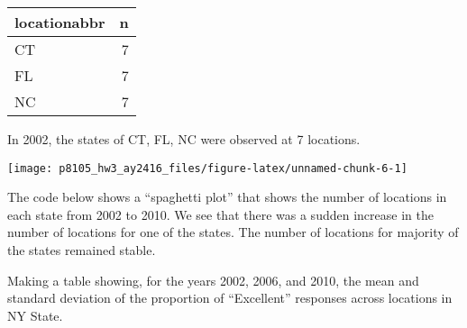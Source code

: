 \documentclass[]{article}
\newenvironment{Shaded}{\begin{snugshade}}{\end{snugshade}}
\newcommand{\KeywordTok}[1]{\textcolor[rgb]{0.13,0.29,0.53}{\textbf{#1}}}
\newcommand{\DataTypeTok}[1]{\textcolor[rgb]{0.13,0.29,0.53}{#1}}
\newcommand{\StringTok}[1]{\textcolor[rgb]{0.31,0.60,0.02}{#1}}
\newcommand{\OperatorTok}[1]{\textcolor[rgb]{0.81,0.36,0.00}{\textbf{#1}}}
\newcommand{\NormalTok}[1]{#1}
\begin{document}
\begin{longtable}[]{@{}lr@{}}
\toprule
locationabbr & n\tabularnewline
\midrule
\endhead
CT & 7\tabularnewline
FL & 7\tabularnewline
NC & 7\tabularnewline
\bottomrule
\end{longtable}

In 2002, the states of CT, FL, NC were observed at 7 locations.

\begin{Shaded}
\end{Shaded}

\texttt{[image: p8105\_hw3\_ay2416\_files/figure-latex/unnamed-chunk-6-1]}

The code below shows a ``spaghetti plot'' that shows the number of
locations in each state from 2002 to 2010. We see that there was a
sudden increase in the number of locations for one of the states. The
number of locations for majority of the states remained stable.

Making a table showing, for the years 2002, 2006, and 2010, the mean and
standard deviation of the proportion of ``Excellent'' responses across
locations in NY State.
\end{document}
